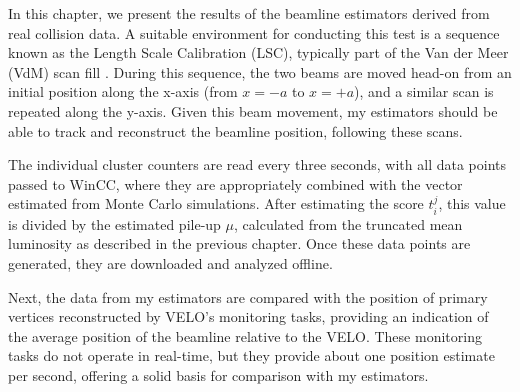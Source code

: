 In this chapter, we present the results of the beamline estimators derived from real collision data. A suitable environment for conducting this test is a sequence known as the Length Scale Calibration (LSC), typically part of the Van der Meer (VdM) scan fill \cite{reference}. During this sequence, the two beams are moved head-on from an initial position along the x-axis (from \(x = -a\) to \(x = +a\)), and a similar scan is repeated along the y-axis. Given this beam movement, my estimators should be able to track and reconstruct the beamline position, following these scans.

The individual cluster counters are read every three seconds, with all data points passed to WinCC, where they are appropriately combined with the vector estimated from Monte Carlo simulations. After estimating the score \(t_i^j\), this value is divided by the estimated pile-up \(\mu\), calculated from the truncated mean luminosity as described in the previous chapter. Once these data points are generated, they are downloaded and analyzed offline. 

Next, the data from my estimators are compared with the position of primary vertices reconstructed by VELO's monitoring tasks, providing an indication of the average position of the beamline relative to the VELO. These monitoring tasks do not operate in real-time, but they provide about one position estimate per second, offering a solid basis for comparison with my estimators.







